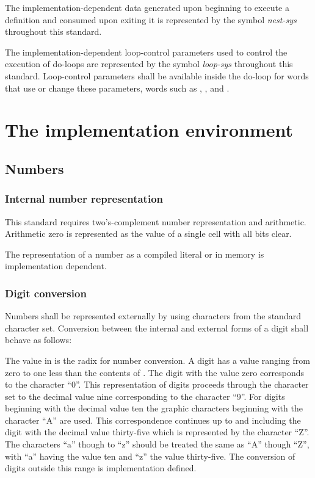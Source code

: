 The implementation-dependent data generated upon beginning to
execute a definition and consumed upon exiting it is represented
by the symbol \emph{nest-sys} throughout this standard.

The implementation-dependent loop-control parameters used to
control the execution of do-loops are represented by the symbol
\emph{loop-sys} throughout this standard. Loop-control parameters
shall be available inside the do-loop for words that use or change
these parameters, words such as , , 
and .


\section{The implementation environment} %

\subsection{Numbers} %

\subsubsection{Internal number representation} %
\label{usage:number}

This standard requires two's-complement number representation and arithmetic.
Arithmetic zero is represented as the value of a single cell with all bits
clear.

The representation of a number as a compiled literal or in memory
is implementation dependent.

\subsubsection{Digit conversion} %
\label{usage:digits}

Numbers shall be represented externally by using characters from
the standard character set. Conversion between the internal and
external forms of a digit shall behave as follows:

The value in  is the radix for number conversion. A
digit has a value ranging from zero to one less than the contents
of . The digit with the value zero corresponds to the
character ``0''. This representation of digits proceeds through
the character set to the decimal value nine corresponding to the
character ``9''. For digits beginning with the decimal value ten
the graphic characters beginning with the character ``A'' are used.
This correspondence continues up to and including the digit with
the decimal value thirty-five which is represented by the character
``Z''. The characters ``a'' though to ``z'' should be treated the
same as ``A'' though ``Z'', with ``a'' having the value ten and
``z'' the value thirty-five.  The conversion of digits outside this
range is implementation defined.

